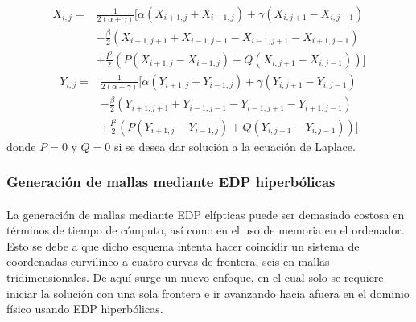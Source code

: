 \documentclass[letterpaper, openright, 12pt]{book}
\begin{document}
    \begin{align}
        X_{i, j} =& \frac{1}{2 \left(\alpha + \gamma\right)}
        \Biggl[
            \alpha \left(X_{i+1, j} + X_{i-1, j}\right)
            + \gamma \left(X_{i, j+1} - X_{i, j-1}\right)\\
            &- \frac{\beta}{2} \left(X_{i+1, j+1} + X_{i-1, j-1}
                    - X_{i-1, j+1} - X_{i+1, j-1}\right)\\
            &+ \frac{I^2}{2} \left( P \left(X_{i+1, j} - X_{i-1, j}\right)
            + Q \left( X_{i, j+1} - X_{i, j-1} \right)\right)
        \Biggr]
    \end{align}
    \begin{align}
        Y_{i, j} =& \frac{1}{2 \left(\alpha + \gamma\right)}
        \Biggl[
            \alpha \left(Y_{i+1, j} + Y_{i-1, j}\right)
            + \gamma \left(Y_{i, j+1} - Y_{i, j-1}\right)\\
            &- \frac{\beta}{2} \left(Y_{i+1, j+1} + Y_{i-1, j-1}
                    - Y_{i-1, j+1} - Y_{i+1, j-1}\right)\\
            &+ \frac{I^2}{2} \left( P \left(Y_{i+1, j} - Y_{i-1, j}\right)
            + Q \left( Y_{i, j+1} - Y_{i, j-1} \right)\right)
        \Biggr]
    \end{align}
    donde $P=0$ y $Q=0$ si se desea dar solución a la ecuación de Laplace.

    \subsubsection{Generación de mallas mediante EDP hiperbólicas}
    \paragraph*{}
    La generación de mallas mediante EDP elípticas puede ser demasiado
    costosa en términos de tiempo de cómputo, así como en el uso de memoria
    en el ordenador. Esto se debe a que dicho esquema intenta hacer
    coincidir un sistema de coordenadas curvilíneo a cuatro curvas de
    frontera, seis en mallas tridimensionales. De aquí surge un nuevo
    enfoque, en el cual solo se requiere iniciar la solución con una sola
    frontera e ir avanzando hacia afuera en el dominio físico usando EDP
    hiperbólicas. \cite{farrashkhalvat}
\end{document}
